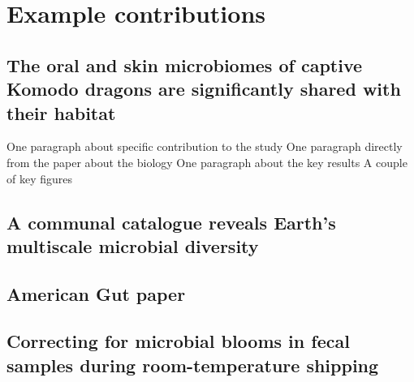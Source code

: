 \glsresetall

\section{Example contributions}\label{section_contributions}
\subsection{The oral and skin microbiomes of captive Komodo dragons are significantly shared with their habitat}
One paragraph about specific contribution to the study
One paragraph directly from the paper about the biology
One paragraph about the key results
A couple of key figures
\subsection{A communal catalogue reveals Earth's multiscale microbial diversity}
\subsection{American Gut paper}
\subsection{Correcting for microbial blooms in fecal samples during room-temperature shipping}
